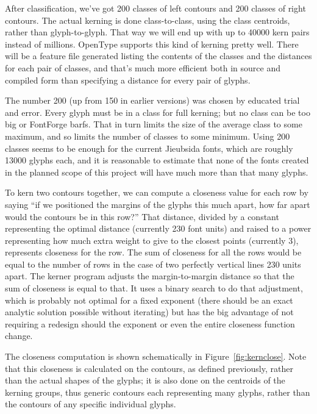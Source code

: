 \documentclass[14pt]{extarticle}
\begin{document}
After classification, we've got 200 classes of left contours and 200 classes
of right contours.  The actual kerning is done class-to-class, using the
class centroids, rather than glyph-to-glyph.  That way we will end up with
up to 40000 kern pairs instead of millions.  OpenType supports this kind of
kerning pretty well.  There will be a feature file generated listing the
contents of the classes and the distances for each pair of classes, and
that's much more efficient both in source and compiled form than specifying
a distance for every pair of glyphs.

The number 200 (up from 150 in earlier versions) was chosen by educated
trial and error.  Every glyph must be in a class for full kerning; but no
class can be too big or FontForge barfs.  That in turn limits the size of
the average class to some maximum, and so limits the number of classes to
some minimum.  Using 200 classes seems to be enough for the current
Jieubsida fonts, which are roughly 13000 glyphs each, and it is reasonable
to estimate that none of the fonts created in the planned scope of this
project will have much more than that many glyphs.

To kern two contours together, we can compute a closeness value for each row
by saying ``if we positioned the margins of the glyphs this much apart, how
far apart would the contours be in this row?'' That distance, divided by a
constant representing the optimal distance (currently 230 font units) and
raised to a power representing how much extra weight to give to the closest
points (currently 3), represents closeness for the row.  The sum of
closeness for all the rows would be equal to the number of rows in the case
of two perfectly vertical lines 230 units apart.  The kerner program adjusts
the margin-to-margin distance so that the sum of closeness is equal to that. 
It uses a binary search to do that adjustment, which is probably not optimal
for a fixed exponent (there should be an exact analytic solution possible
without iterating) but has the big advantage of not requiring a redesign
should the exponent or even the entire closeness function change.

The closeness computation is shown schematically in
Figure~\ref{fig:kernclose}.  Note that this closeness is calculated on the
contours, as defined previously, rather than the actual shapes of the
glyphs; it is also done on the centroids of the kerning groups, thus generic
contours each representing many glyphs, rather than the contours of any
specific individual glyphs.
\end{document}

